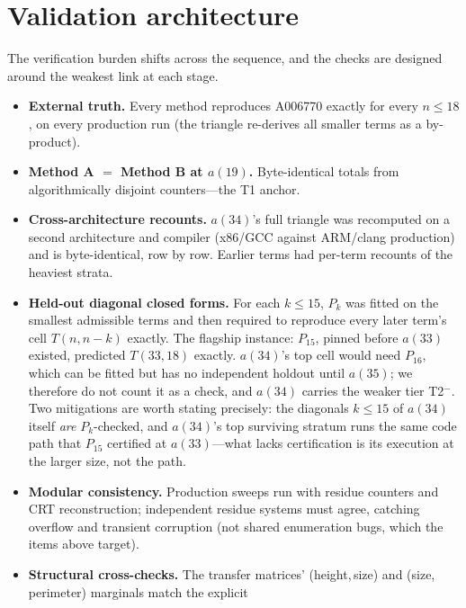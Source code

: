 \documentclass[11pt]{article}
\newcommand{\tierone}{\textsf{T1}}
\newcommand{\tiertwominus}{\textsf{T2}$^{-}$}
\begin{document}
\section{Validation architecture}
\label{sec:confirm}

The verification burden shifts across the sequence, and the checks are
designed around the weakest link at each stage.

\begin{itemize}
  \item \textbf{External truth.} Every method reproduces A006770 exactly for
        every $n\le18$, on every production run (the triangle re-derives all
        smaller terms as a by-product).
  \item \textbf{Method A $=$ Method B at $a(19)$.} Byte-identical totals from
        algorithmically disjoint counters---the \tierone{} anchor.
  \item \textbf{Cross-architecture recounts.} $a(34)$'s full triangle was
        recomputed on a second architecture and compiler (x86/GCC against
        ARM/clang production) and is byte-identical, row by row. Earlier
        terms had per-term recounts of the heaviest strata.
  \item \textbf{Held-out diagonal closed forms.} For each $k\le15$, $P_k$
        was fitted on the smallest admissible terms and then required to
        reproduce every later term's cell $T(n,n-k)$ exactly. The flagship
        instance: $P_{15}$, pinned before $a(33)$ existed, predicted
        $T(33,18)$ exactly. $a(34)$'s top cell would need $P_{16}$, which
        can be fitted but has no independent holdout until $a(35)$; we
        therefore do not count it as a check, and $a(34)$ carries the weaker
        tier \tiertwominus{}. Two mitigations are worth stating precisely:
        the diagonals $k\le15$ of $a(34)$ itself \emph{are} $P_k$-checked,
        and $a(34)$'s top surviving stratum runs the same code path that
        $P_{15}$ certified at $a(33)$---what lacks certification is its
        execution at the larger size, not the path.
  \item \textbf{Modular consistency.} Production sweeps run with residue
        counters and CRT reconstruction; independent residue systems must
        agree, catching overflow and transient corruption (not shared
        enumeration bugs, which the items above target).
  \item \textbf{Structural cross-checks.} The transfer matrices'
        (height,\,size) and (size,\,perimeter) marginals match the explicit

\end{itemize}
\end{document}
